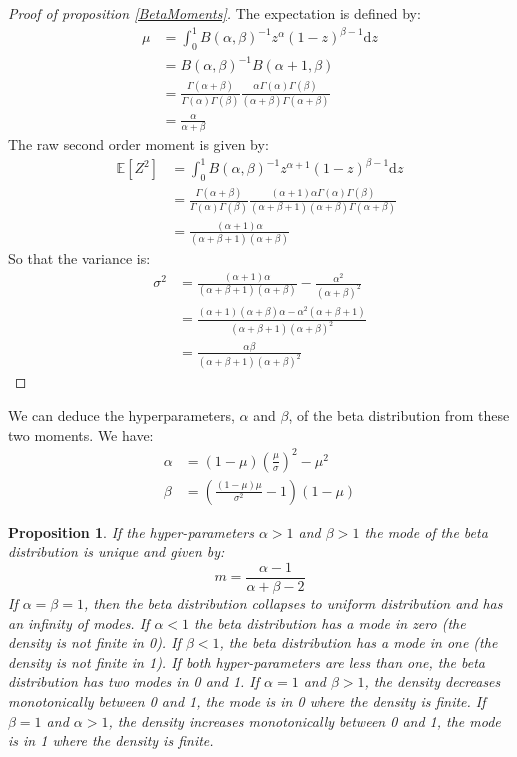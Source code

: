 \documentclass{amsart}
\theoremstyle{plain}
\newtheorem{proposition}{Proposition}[section]
\theoremstyle{remark}
\numberwithin{equation}{section}
\begin{document}
\begin{proof}[Proof of proposition \ref{BetaMoments}]
  The expectation is defined by:
  \[
    \begin{split}
      \mu &= \int_0^1 B(\alpha,\beta)^{-1}z^{\alpha}(1-z)^{\beta-1}\mathrm dz\\
      &= B(\alpha,\beta)^{-1}B(\alpha+1,\beta)\\
      &= \frac{\Gamma(\alpha+\beta)}{\Gamma(\alpha)\Gamma(\beta)}\frac{\alpha\Gamma(\alpha)\Gamma(\beta)}{(\alpha+\beta)\Gamma(\alpha+\beta)}\\
      &= \frac{\alpha}{\alpha+\beta}
    \end{split}
  \]
  The raw second order moment is given by:
  \[
    \begin{split}
      \mathbb E[Z^2] &= \int_0^1 B(\alpha,\beta)^{-1}z^{\alpha+1}(1-z)^{\beta-1}\mathrm dz\\
      &= \frac{\Gamma(\alpha+\beta)}{\Gamma(\alpha)\Gamma(\beta)}\frac{(\alpha+1)\alpha\Gamma(\alpha)\Gamma(\beta)}{(\alpha+\beta+1)(\alpha+\beta)\Gamma(\alpha+\beta)}\\
      &= \frac{(\alpha+1)\alpha}{(\alpha+\beta+1)(\alpha+\beta)}
    \end{split}
  \]
  So that the variance is:
  \[
    \begin{split}
      \sigma^2 &= \frac{(\alpha+1)\alpha}{(\alpha+\beta+1)(\alpha+\beta)}-\frac{\alpha^2}{(\alpha+\beta)^2}\\
      &= \frac{(\alpha+1)(\alpha+\beta)\alpha-\alpha^2(\alpha+\beta+1)}{(\alpha+\beta+1)(\alpha+\beta)^2}\\
      &= \frac{\alpha\beta}{(\alpha+\beta+1)(\alpha+\beta)^2}
    \end{split}
  \]
\end{proof}

We can deduce the hyperparameters, $\alpha$ and $\beta$, of the beta distribution from these two moments. We have:
\[
  \begin{split}
    \alpha &=  (1-\mu)\left(\frac{\mu}{\sigma}\right)^2 - \mu^2\\
    \beta  &= \left(\frac{(1-\mu)\mu}{\sigma^2}-1\right)(1-\mu)
  \end{split}
\]

\begin{proposition}\label{BetaMode}
  If the hyper-parameters $\alpha>1$ and $\beta>1$ the mode of the beta distribution is unique and given by:
  \[
    m = \frac{\alpha-1}{\alpha+\beta-2}
  \]
  If $\alpha=\beta=1$, then the beta distribution collapses to uniform
  distribution and has an infinity of modes. If $\alpha<1$ the beta
  distribution has a mode in zero (the density is not finite in 0). If
  $\beta<1$, the beta distribution has a mode in one (the density is
  not finite in 1). If both hyper-parameters are less than one, the
  beta distribution has two modes in 0 and 1. If $\alpha=1$ and
  $\beta>1$, the density decreases monotonically between 0 and 1, the
  mode is in 0 where the density is finite. If $\beta=1$ and
  $\alpha>1$, the density increases monotonically between 0 and 1, the
  mode is in 1 where the density is finite.
\end{proposition}
\end{document}
